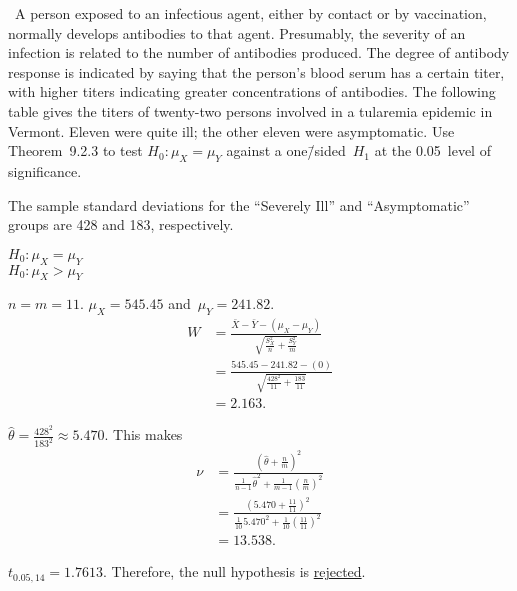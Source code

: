 \begin{problem}
  ~A person exposed to an infectious agent, either by contact or by vaccination, normally develops antibodies to that agent. Presumably, the severity of an infection is related to the number of antibodies produced. The degree of antibody response is indicated by saying that the person’s blood serum has a certain titer, with higher titers indicating greater concentrations of antibodies. The following table gives the titers of twenty-two persons involved in a tularemia epidemic in Vermont. Eleven were quite ill; the other eleven were asymptomatic. Use Theorem~9.2.3 to test ${H_0: \mu_X = \mu_Y}$ against a one\=/sided~${H_1}$ at the 0.05~level of significance.

  The sample standard deviations for the “Severely Ill” and “Asymptomatic” groups are 428 and 183, respectively.
\end{problem}

\noindent
${H_0: \mu_{X} = \mu_{Y}}$ \\
${H_0: \mu_{X} > \mu_{Y}}$

\noindent
${n = m = 11}$. ${\mu_{X} = 545.45}$ and~${\mu_{Y} = 241.82}$.
\begin{align}
  W &= \frac{\bar{X} - \bar{Y} - (\mu_{X} - \mu_{Y})}{\sqrt{\frac{S_{X}^{2}}{n} + \frac{S_{Y}^{2}}{m}}} \\
    &= \frac{545.45 - 241.82 - (0)}{\sqrt{\frac{428^2}{11}+\frac{183}{11}}} \\
    &= 2.163\text{.}
\end{align}

${\hat{\theta} = \frac{428^2}{183^2} \approx 5.470}$.  This makes
\begin{align}
  \nu &= \frac{(\hat{\theta} + \frac{n}{m})^2}{\frac{1}{n-1}\hat{\theta}^2 + \frac{1}{m-1}\left(\frac{n}{m}\right)^2} \\
      &= \frac{\left(5.470 + \frac{11}{11}\right)^2}{\frac{1}{10} 5.470^2 + \frac{1}{10}\left(\frac{11}{11}\right)^2} \\
      &= 13.538 \text{.}
\end{align}

\noindent
${t_{0.05,14} = 1.7613}$.  Therefore, the null hypothesis is \underline{rejected}.
